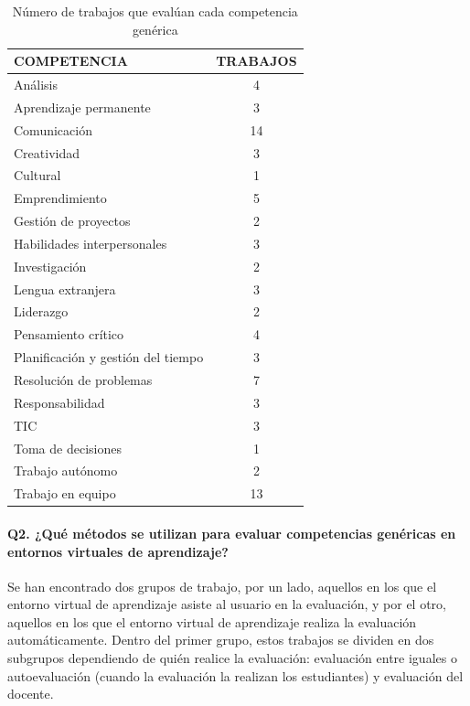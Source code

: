 \begin{table}
  \begin{center}
  \begin{tabular}{| m{10cm} | c |}
    \hline
    COMPETENCIA & TRABAJOS\\
    \hline
    \hline
    Análisis & 4\\
    \hline
    Aprendizaje permanente & 3\\
    \hline
    Comunicación & 14\\
    \hline
    Creatividad & 3\\
    \hline
    Cultural & 1\\
    \hline
    Emprendimiento & 5\\
    \hline
    Gestión de proyectos & 2\\
    \hline
    Habilidades interpersonales & 3\\
    \hline
    Investigación & 2\\
    \hline 
    Lengua extranjera & 3\\
    \hline
    Liderazgo & 2\\
    \hline
    Pensamiento crítico & 4\\
    \hline
    Planificación y gestión del tiempo & 3\\
    \hline
    Resolución de problemas & 7\\
    \hline
    Responsabilidad & 3\\
    \hline
    TIC & 3\\
    \hline
    Toma de decisiones & 1\\
    \hline
    Trabajo autónomo & 2\\
    \hline
    Trabajo en equipo & 13\\
    \hline
  \end{tabular}
\end{center}
\caption{Número de trabajos que evalúan cada competencia genérica}
\label{tab:TrabajosCompetencia}
\end{table} 

\paragraph*{Q2. ¿Qué métodos se utilizan para evaluar competencias genéricas en entornos virtuales de aprendizaje?}

Se han encontrado dos grupos de trabajo, por un lado, aquellos en los que el entorno virtual de aprendizaje asiste al usuario en la evaluación, y por el otro, aquellos en los que el entorno virtual de aprendizaje realiza la evaluación automáticamente. Dentro del primer grupo, estos trabajos se dividen en dos subgrupos dependiendo de quién realice la evaluación: evaluación entre iguales o autoevaluación (cuando la evaluación la realizan los estudiantes) y evaluación del docente.

